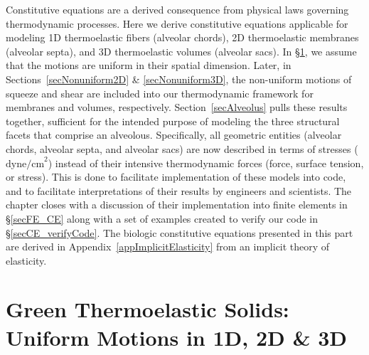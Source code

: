 Constitutive equations are a derived consequence from physical laws governing thermo\-dynamic processes.  Here we derive constitutive equations applicable for modeling 1D thermo\-elastic fibers (alveolar chords), 2D thermo\-elastic membranes (alveolar septa), and 3D thermo\-elastic volumes (alveolar sacs).  In \S\ref{secUniformCE}, we assume that the motions are uniform in their spatial dimension.  Later, in Sections~\ref{secNonuniform2D} \& \ref{secNonuniform3D}, the non-uniform motions of squeeze and shear are included into our thermo\-dynamic framework for membranes and volumes, respectively.  Section~\ref{secAlveolus} pulls these results together, sufficient for the intended purpose of modeling the three structural facets that comprise an alveolous.  Specifically, all geometric entities (alveolar chords, alveolar septa, and alveolar sacs) are now described in terms of stresses ($\text{dyne/cm}^2$) instead of their intensive thermo\-dynamic forces (force, surface tension, or stress).  This is done to facilitate implementation of these models into code, and to facilitate interpretations of their results by engineers and scientists.  The chapter closes with a discussion of their implementation into finite elements in \S\ref{secFE_CE} along with a set of examples created to verify our code in \S\ref{secCE_verifyCode}.  The biologic constitutive equations presented in this part are derived in Appendix~\ref{appImplicitElasticity} from an implicit theory of elasticity.

\section{Green Thermoelastic Solids: Uniform Motions in 1D, 2D \& 3D}
\label{secUniformCE}


